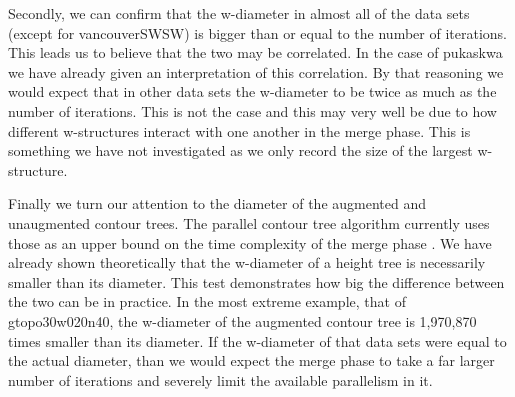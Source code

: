 Secondly, we can confirm that the w-diameter in almost all of the data sets (except for vancouverSWSW) is bigger than or equal to the number of iterations. This leads us to believe that the two may be correlated. In the case of pukaskwa we have already given an interpretation of this correlation. By that reasoning we would expect that in other data sets the w-diameter to be twice as much as the number of iterations. This is not the case and this may very well be due to how different w-structures interact with one another in the merge phase. This is something we have not investigated as we only record the size of the largest w-structure.


Finally we turn our attention to the diameter of the augmented and unaugmented contour trees. The parallel contour tree algorithm currently uses those as an upper bound on the time complexity of the merge phase \cite{parallel-peak-pruning}. We have already shown theoretically that the w-diameter of a height tree is necessarily smaller than its diameter. This test demonstrates how big the difference between the two can be in practice. In the most extreme example, that of gtopo30w020n40, the w-diameter of the augmented contour tree is 1,970,870 times smaller than its diameter. If the w-diameter of that data sets were equal to the actual diameter, than we would expect the merge phase to take a far larger number of iterations and severely limit the available parallelism in it.

